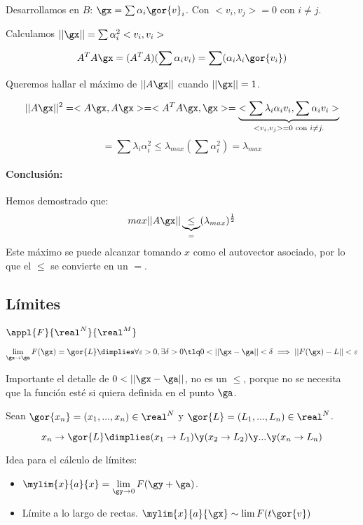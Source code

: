 \documentclass{apuntes}
\begin{document}
 Desarrollamos en $B$: $\gx = \sum \alpha_i \gor{v}_i$. Con $<v_i,v_j> = 0$ con $i \neq j$.

 Calculamos $||\gx|| = \sum \alpha_i^2<v_i,v_i>$
 
 $$A^TA\gx = (A^TA)(\sum \alpha_i v_i) = \sum (\alpha_i\lambda_i\gor{v_i})$$
 
 Queremos hallar el máximo de $||A\gx||$ cuando $||\gx|| = 1$.
 
 $$||A\gx||^2 = <A\gx,A\gx> = <A^TA\gx,\gx> = \underbrace{<\sum \lambda_i \alpha_i v_i,\sum\alpha_i v_i>}_{<v_i,v_j> =0 \text{ con } i \neq j.}$$
 $$= \sum \lambda_i \alpha_i^2 \leq \lambda_{max} (\sum \alpha_i^2) = \lambda_{max}$$
 
 \paragraph{Conclusión: }
 Hemos demostrado que:
 $$ max||A\gx|| \underbrace{\leq}_{=} ({\lambda_{max}})^{\frac{1}{2}}$$
 Este máximo se puede alcanzar tomando $x$ como el autovector asociado, por lo que el $\leq$ se convierte en un $=$.
 
 \subsection{Límites}
 $\appl{F}{\real^N}{\real^M}$
 \begin{defn}[Límite]
  $$\lim_{\gx \rightarrow \ga} F(\gx) = \gor{L} \dimplies \forall \varepsilon > 0,  \exists \delta>0 \tlq 0<||\gx-\ga|| <\delta \implies ||F(\gx) - L||<\varepsilon$$
 \end{defn}
 Importante el detalle de $0 < ||\gx-\ga||$, no es un $\leq$, porque no se necesita que la función esté si quiera definida en el punto $\ga$.  
 
 \begin{theorem}
  
  Sean $\gor{x_n} = (x_1,...,x_n) \in \real^N$ y $\gor{L} = (L_1,...,L_n) \in \real^N$.
 
  $$x_n \rightarrow \gor{L} \dimplies (x_1 \rightarrow L_1) \y (x_2 \rightarrow L_2) \y ... \y (x_n \rightarrow L_n)$$
 \end{theorem}
 
 Idea para el cálculo de límites: 
 \begin{itemize}
  \item $\displaystyle\mylim{x}{a}{x} = \lim_{\gy\rightarrow 0} F(\gy+\ga)$.
  \item Límite a lo largo de rectas. $\displaystyle\mylim{x}{a}{\gx} \sim \lim F({t\gor{v}})$
 
 \end{itemize}
 
\end{document}

